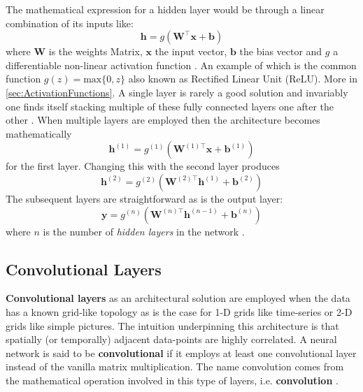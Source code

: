 The mathematical expression for a hidden layer would be through a linear combination of its inputs like:
\begin{equation}
    \bm{h} = g \left( \bm{W}^\top \bm{x} + \bm{b} \right)
\label{2equ:1}
\end{equation}
where $\bm{W}$ is the weights Matrix, $\bm{x}$ the input vector, $\bm{b}$ the bias vector and $g$ a differentiable non-linear activation function \citep{Bishop2006PatternLearning, Goodfellow2016}. An example of which is the common function $g(z) = \text{max} \{0, z \}$ also known as Rectified Linear Unit (ReLU). More in \cref{sec:ActivationFunctions}.
A single layer is rarely a good solution and invariably one finds itself stacking multiple of these fully connected layers one after the other \citep{Goodfellow2016}. When multiple layers are employed then the architecture becomes mathematically
\begin{equation}
    \bm{h}^{(1)} = g^{(1)} \left( \bm{W}^{(1)\top} \bm{x} + \bm{b}^{(1)} \right)
\label{equ:FCL1}
\end{equation}
for the first layer. Changing this with the second layer produces
\begin{equation}
    \bm{h}^{(2)} = g^{(2)} \left( \bm{W}^{(2)\top} \bm{h}^{(1)} + \bm{b}^{(2)} \right)
\label{equ:FCL2}
\end{equation}
The subsequent layers are straightforward as is the output layer:
\begin{equation}
    \bm{y} = g^{(n)} \left( \bm{W}^{(n)\top} \bm{h}^{(n-1)} + \bm{b}^{(n)} \right)
\label{equ:FCL3}
\end{equation}
where $n$ is the number of \textit{hidden layers} in the network \citep{Goodfellow2016}.

\subsection{Convolutional Layers} \label{sec:convolutional_layers}

\textbf{Convolutional layers} as an architectural solution are employed when the data has a known grid-like topology as is the case for 1-D grids like time-series or 2-D grids like simple pictures. The intuition underpinning this architecture is that spatially (or temporally) adjacent data-points are highly correlated. A neural network is said to be \textbf{convolutional} if it employs at least one convolutional layer instead of the vanilla matrix multiplication. The name convolution comes from the mathematical operation involved in this type of layers, i.e. \textbf{convolution} \citep{Goodfellow2016}.

